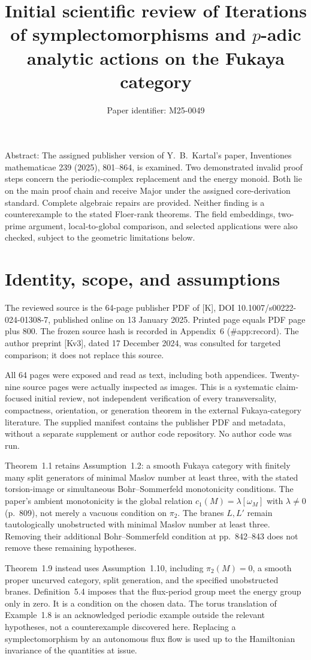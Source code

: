 \documentclass[10pt]{article}
\title{Initial scientific review of
Iterations of symplectomorphisms and
\(p\)-adic analytic actions on the Fukaya category}
\author{Paper identifier: M25-0049}
\date{}
\begin{document}
\maketitle
Abstract: The assigned publisher version of Y. B. Kartal’s paper, Inventiones mathematicae 239 (2025), 801–864, is examined. Two demonstrated invalid proof steps concern the periodic-complex replacement and the energy monoid. Both lie on the main proof chain and receive Major under the assigned core-derivation standard. Complete algebraic repairs are provided. Neither finding is a counterexample to the stated Floer-rank theorems. The field embeddings, two-prime argument, local-to-global comparison, and selected applications were also checked, subject to the geometric limitations below.\par
\section*{Identity, scope, and assumptions}
The reviewed source is the 64-page publisher PDF of [K], DOI 10.1007/s00222-024-01308-7, published online on 13 January 2025. Printed page equals PDF page plus 800. The frozen source hash is recorded in Appendix 6 (\#app:record). The author preprint [Kv3], dated 17 December 2024, was consulted for targeted comparison; it does not replace this source.\par
All 64 pages were exposed and read as text, including both appendices. Twenty-nine source pages were actually inspected as images. This is a systematic claim-focused initial review, not independent verification of every transversality, compactness, orientation, or generation theorem in the external Fukaya-category literature. The supplied manifest contains the publisher PDF and metadata, without a separate supplement or author code repository. No author code was run.\par
Theorem 1.1 retains Assumption 1.2: a smooth Fukaya category with finitely many split generators of minimal Maslov number at least three, with the stated torsion-image or simultaneous Bohr–Sommerfeld monotonicity conditions. The paper’s ambient monotonicity is the global relation \(c_1(M)=\lambda[\omega_M]\) with \(\lambda\ne0\) (p. 809), not merely a vacuous condition on \(\pi_2\). The branes \(L,L'\) remain tautologically unobstructed with minimal Maslov number at least three. Removing their additional Bohr–Sommerfeld condition at pp. 842–843 does not remove these remaining hypotheses.\par
Theorem 1.9 instead uses Assumption 1.10, including \(\pi_2(M)=0\), a smooth proper uncurved category, split generation, and the specified unobstructed branes. Definition 5.4 imposes that the flux-period group meet the energy group only in zero. It is a condition on the chosen data. The torus translation of Example 1.8 is an acknowledged periodic example outside the relevant hypotheses, not a counterexample discovered here. Replacing a symplectomorphism by an autonomous flux flow is used up to the Hamiltonian invariance of the quantities at issue.\par
\end{document}
